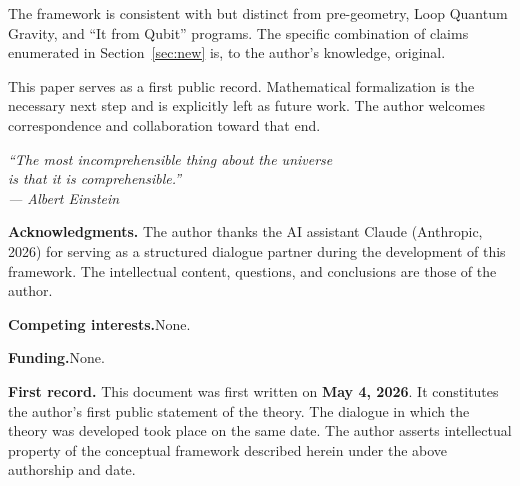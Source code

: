 \documentclass[12pt,a4paper]{article}
\begin{document}
\noindent
The framework is consistent with but distinct from pre-geometry, Loop
Quantum Gravity, and ``It from Qubit'' programs.  The specific
combination of claims enumerated in Section~\ref{sec:new} is, to the
author's knowledge, original.

This paper serves as a first public record.  Mathematical formalization
is the necessary next step and is explicitly left as future work.  The
author welcomes correspondence and collaboration toward that end.

\bigskip\bigskip

\begin{center}
\itshape
``The most incomprehensible thing about the universe\\
is that it is comprehensible.''\\[0.3em]
\upshape — Albert Einstein
\end{center}

\bigskip

\noindent\textbf{Acknowledgments.}\quad
The author thanks the AI assistant Claude (Anthropic, 2026) for
serving as a structured dialogue partner during the development of this
framework.  The intellectual content, questions, and conclusions are
those of the author.

\bigskip\noindent\textbf{Competing interests.}\quad None.

\bigskip\noindent\textbf{Funding.}\quad None.

\bigskip\noindent\textbf{First record.}\quad
This document was first written on \textbf{May 4, 2026}.  It
constitutes the author's first public statement of the theory.  The
dialogue in which the theory was developed took place on the same date.
The author asserts intellectual property of the conceptual framework
described herein under the above authorship and date.

\newpage


\end{document}
